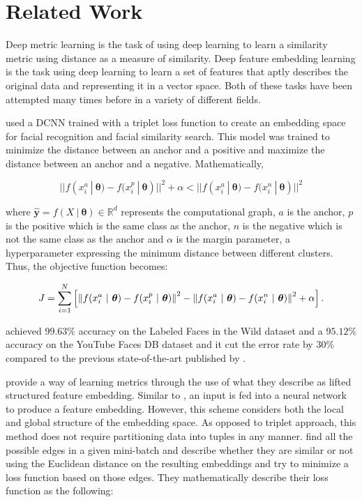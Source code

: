 \chapter{Related Work}
\label{relwork}

Deep metric learning is the task of using deep learning to learn a similarity metric using distance as a measure of similarity. Deep feature embedding learning is the task using deep learning to learn a set of features that aptly describes the original data and representing it in a vector space. Both of these tasks have been attempted many times before in a variety of different fields. 

\citet{facenet} used a DCNN trained with a triplet loss function to create an embedding space for facial recognition and facial similarity search. This model was trained to minimize the distance between an anchor and a positive and maximize the distance between an anchor and a negative. Mathematically,

\begin{equation}
  || f(x_{i}^{a} \ | \ \boldsymbol{\theta}) - f(x_{i}^{p} \ | \ \boldsymbol{\theta})||^2 + \alpha < || f(x_i^a \ | \ \boldsymbol{\theta}) - f(x_i^n \ | \ \boldsymbol{\theta}) ||^2
\end{equation}

\noindent
where $ \mathbf{\hat{y}} = f(X \ | \ \boldsymbol{\theta}) \in \mathbb{R}^d $ represents the computational graph, $a$ is the anchor, $p$ is the positive which is the same class as the anchor, $n$ is the negative which is not the same class as the anchor and $ \alpha$ is the margin parameter, a hyperparameter expressing the minimum distance between different clusters. Thus, the objective function becomes:  

\begin{equation}
  J = \sum_{i=1}^{N} \left[
  \norm{f(x_{i}^{a} \ | \ \boldsymbol{\theta}) - f(x_{i}^{p} \ | \ \boldsymbol{\theta})}^2
  - \norm{f(x_i^a \ | \ \boldsymbol{\theta}) - f(x_i^n \ | \ \boldsymbol{\theta}) }^2 + \alpha\right].
\end{equation}

\noindent
\citet{facenet} achieved $99.63\%$ accuracy on the Labeled Faces in the Wild dataset and a $95.12\%$ accuracy on the YouTube Faces DB dataset and it cut the error rate by $30\%$ compared to the previous state-of-the-art published by \citet{sun2014deeply}.

\citet{lifted_structure_embedding} provide a way of learning metrics through the use of what they describe as lifted structured feature embedding. Similar to \citet{facenet}, an input is fed into a neural network to produce a feature embedding. However, this scheme considers both the local and global structure of the embedding space. As opposed to triplet approach, this method does not require partitioning data into tuples in any manner. \citet{lifted_structure_embedding} find all the possible edges in a given mini-batch and describe whether they are similar or not using the Euclidean distance on the resulting embeddings and try to minimize a loss function based on those edges. They mathematically describe their loss function as the following: 

